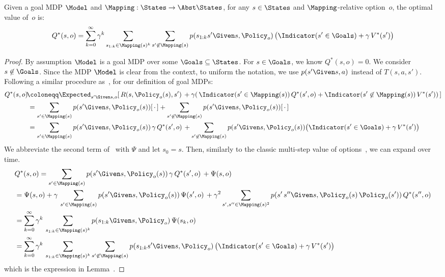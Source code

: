 \begin{lemmamain}{}
	Given a goal MDP $\Model$ and $\Mapping: \States \to \Abst\States$,
	for any $s \in \States$ and $\Mapping$-relative option~$o$, the optimal value of~$o$ is:
	\begin{equation}
		Q^*(s, o) =
			\sum_{k=0}^{\infty} \gamma^k \sum_{s_{1:k} \in \Mapping(s)^k} \sum_{s' \not\in \Mapping(s)}
			p(s_{1:k} s' \Given s, \Policy_o)\, \bigl( \Indicator(s' \in \Goals) + \gamma\, V^*(s') \bigr)
	\end{equation}
\end{lemmamain}
\begin{proof}
	By assumption $\Model$ is a goal MDP over some $\Goals \subseteq \States$.
	For $s \in \Goals$, we know $Q^*(s, o) = 0$. We consider $s \not\in \Goals$.
	Since the MDP $\Model$ is clear from the context, to uniform the notation, we use $p(s' \Given s, a)$ instead of $T(s, a, s')$.
	Following a similar procedure as~\cite{abel_2020_ValuePreserving}, for our definition of goal MDPs:
	\begin{align}
		{Q}^*(s, o) &\!\coloneqq 
			\Expected_{s' \Given s, o}[\, R(s, \Policy_o(s), s')\, +
				\gamma (\, \Indicator(s' \in \Mapping(s))\, {Q}^*(s', o)
				+ \Indicator(s' \not\in \Mapping(s))\, {V}^*(s'))\,] \\
			&= \sum_{s' \in \Mapping(s)} p(s' \Given s, \Policy_o(s))[\,\cdot\,] +
				\sum_{s' \not\in \Mapping(s)} p(s' \Given s, \Policy_o(s))[\,\cdot\,] \\
			&= \sum_{s' \in \Mapping(s)} p(s' \Given s, \Policy_o(s)) \,
					\gamma \, {Q}^*(s', o)\, +
				\sum_{s' \not\in \Mapping(s)} p(s' \Given s, \Policy_o(s)) \bigl(
					\Indicator(s' \in \Goals) + \gamma\, {V}^*(s')
				\bigr) 
				\label{eq:option-value-to-expand}
	\end{align}
	We abbreviate the second term of~ with $\Psi$ and let $s_0 = s$.
	Then, similarly to the classic multi-step value of options~\cite{sutton1999between}, we can expand over time.
	\begin{align}
		&Q^*(s, o) = \sum_{s' \in \Mapping(s)} p(s' \Given s, \Policy_o(s)) \,
					\gamma \, {Q}^*(s', o)\, + \Psi(s, o)\\
			&= \Psi(s, o) + \gamma\, \sum_{s' \in \Mapping(s)} p(s' \Given s,
					\Policy_o(s))\,\Psi(s', o) \,+
				\gamma^2 \sum_{s', s'' \in \Mapping(s)^2} 
				p(s'\,s'' \Given s, \Policy_o(s)\,\Policy_o(s'))\, Q^*(s'', o)\\
			&= \sum_{k=0}^{\infty} \gamma^k\, \sum_{s_{1:k} \in \Mapping(s)^{k}}
				p(s_{1:k} \Given s, \Policy_o)\,\Psi(s_{k}, o)\\
			&= \sum_{k=0}^{\infty} \gamma^k\,
				\sum_{s_{1:k} \in \Mapping(s)^k} \sum_{s'\not\in \Mapping(s)}
				p(s_{1:k} s' \Given s, \Policy_o)\, \bigl(
				\Indicator(s' \in \Goals) + \gamma\, V^*(s') \bigr)
				\label{eq:options-multistep-proof-end}
	\end{align}
	which is the expression in Lemma~.
\end{proof}

